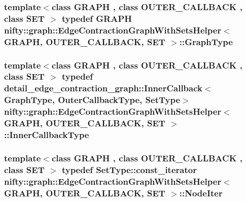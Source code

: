 \subsubsection[{Graph\+Type}]{\setlength{\rightskip}{0pt plus 5cm}template$<$class G\+R\+A\+P\+H , class O\+U\+T\+E\+R\+\_\+\+C\+A\+L\+L\+B\+A\+C\+K , class S\+E\+T $>$ typedef G\+R\+A\+P\+H {\bf nifty\+::graph\+::\+Edge\+Contraction\+Graph\+With\+Sets\+Helper}$<$ G\+R\+A\+P\+H, O\+U\+T\+E\+R\+\_\+\+C\+A\+L\+L\+B\+A\+C\+K, S\+E\+T $>$\+::{\bf Graph\+Type}}\label{structnifty_1_1graph_1_1EdgeContractionGraphWithSetsHelper_a7f5226bf25f277d906a526db55556cdf}
\hypertarget{structnifty_1_1graph_1_1EdgeContractionGraphWithSetsHelper_a04b455cc805d998b02d24ee3a11523ec}{}
\subsubsection[{Inner\+Callback\+Type}]{\setlength{\rightskip}{0pt plus 5cm}template$<$class G\+R\+A\+P\+H , class O\+U\+T\+E\+R\+\_\+\+C\+A\+L\+L\+B\+A\+C\+K , class S\+E\+T $>$ typedef detail\+\_\+edge\+\_\+contraction\+\_\+graph\+::\+Inner\+Callback$<${\bf Graph\+Type}, {\bf Outer\+Callback\+Type}, {\bf Set\+Type}$>$ {\bf nifty\+::graph\+::\+Edge\+Contraction\+Graph\+With\+Sets\+Helper}$<$ G\+R\+A\+P\+H, O\+U\+T\+E\+R\+\_\+\+C\+A\+L\+L\+B\+A\+C\+K, S\+E\+T $>$\+::{\bf Inner\+Callback\+Type}}\label{structnifty_1_1graph_1_1EdgeContractionGraphWithSetsHelper_a04b455cc805d998b02d24ee3a11523ec}
\hypertarget{structnifty_1_1graph_1_1EdgeContractionGraphWithSetsHelper_a6d07b232c0af5bf7170edb2eea02a8fb}{}
\subsubsection[{Node\+Iter}]{\setlength{\rightskip}{0pt plus 5cm}template$<$class G\+R\+A\+P\+H , class O\+U\+T\+E\+R\+\_\+\+C\+A\+L\+L\+B\+A\+C\+K , class S\+E\+T $>$ typedef Set\+Type\+::const\+\_\+iterator {\bf nifty\+::graph\+::\+Edge\+Contraction\+Graph\+With\+Sets\+Helper}$<$ G\+R\+A\+P\+H, O\+U\+T\+E\+R\+\_\+\+C\+A\+L\+L\+B\+A\+C\+K, S\+E\+T $>$\+::{\bf Node\+Iter}}\label{structnifty_1_1graph_1_1EdgeContractionGraphWithSetsHelper_a6d07b232c0af5bf7170edb2eea02a8fb}
\hypertarget{structnifty_1_1graph_1_1EdgeContractionGraphWithSetsHelper_a254e8886638750a06342b813be34344d}{}

